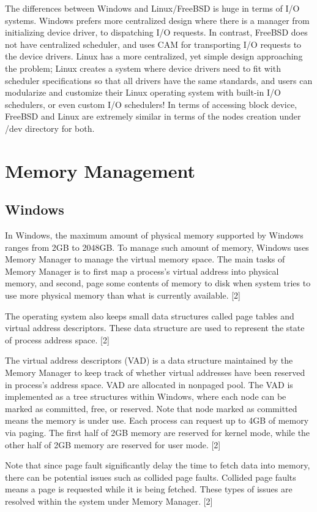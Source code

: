 \documentclass[10pt,a4paper]{article}
\begin{document}
The differences between Windows and Linux/FreeBSD is huge in terms of I/O systems. Windows prefers more centralized design where there is a manager from initializing device driver, to dispatching I/O requests. In contrast, FreeBSD does not have centralized scheduler, and uses CAM for transporting I/O requests to the device drivers. Linux has a more centralized, yet simple design approaching the problem; Linux creates a system where device drivers need to fit with scheduler specifications so that all drivers have the same standards, and users can modularize and customize their Linux operating system with built-in I/O schedulers, or even custom I/O schedulers! In terms of accessing block device, FreeBSD and Linux are extremely similar in terms of the nodes creation under /dev directory for both.

\section{Memory Management}
\subsection{Windows}
In Windows, the maximum amount of physical memory supported by Windows ranges from 2GB to 2048GB. To manage such amount of memory, Windows uses Memory Manager to manage the virtual memory space. The main tasks of Memory Manager is to first map a process’s virtual address into physical memory, and second, page some contents of memory to disk when system tries to use more physical memory than what is currently available. [2]

The operating system also keeps small data structures called page tables and virtual address descriptors. These data structure are used to represent the state of process address space. [2]

The virtual address descriptors (VAD) is a data structure maintained by the Memory Manager to keep track of whether virtual addresses have been reserved in process’s address space. VAD are allocated in nonpaged pool. The VAD is implemented as a tree structures within Windows, where each node can be marked as committed, free, or reserved. Note that node marked as committed means the memory is under use. Each process can request up to 4GB of memory via paging. The first half of 2GB memory are reserved for kernel mode, while the other half of 2GB memory are reserved for user mode. [2]

Note that since page fault significantly delay the time to fetch data into memory, there can be potential issues such as collided page faults. Collided page faults means a page is requested while it is being fetched. These types of issues are resolved within the system under Memory Manager. [2]
\end{document}
